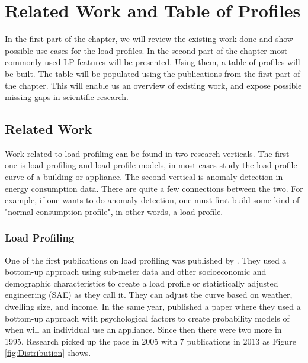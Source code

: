 \chapter{Related Work and Table of Profiles}
\label{chapter2}

In the first part of the chapter, we will review the existing work done and show possible use-cases for the load profiles.  
In the second part of the chapter most commonly used LP features will be presented. 
Using them, a table of profiles will be built. 
The table will be populated using the publications from the first part of the chapter.
This will enable us an overview of existing work, and expose possible missing gaps in scientific research.

\section{Related Work}
\label{sec:related_work}
Work related to load profiling can be found in two research verticals. 
The first one is load profiling and load profile models, in most cases study the load profile curve of a building or appliance.
The second vertical is anomaly detection in energy consumption data. There are quite a few connections between the two. 
For example, if one wants to do anomaly detection, one must first build some kind of "normal consumption profile", in other words, a load profile.

\subsection{Load Profiling}

One of the first publications on load profiling was published by \cite{TRAIN19851103}.
They used a bottom-up approach using sub-meter data and other socioeconomic and demographic characteristics 
to create a load profile or statistically adjusted engineering (SAE) as they call it.
They can adjust the curve based on weather, dwelling size, and income. 
In the same year, \cite{WALKER1985} published a paper where they used a bottom-up approach with psychological factors to create probability models of when will an individual use an appliance.
Since then there were two more in 1995. Research picked up the pace in 2005 with 7 publications in 2013 as Figure \ref{fig:Distribution} shows.

